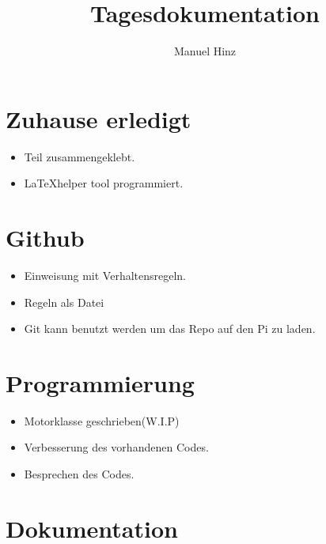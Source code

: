 \documentclass{article}
\author{Manuel Hinz}
\title{Tagesdokumentation}
\begin{document}
\maketitle

\section{Zuhause erledigt}

\begin{itemize}

\item Teil zusammengeklebt.

\item \LaTeX helper tool programmiert. 

\end{itemize}

\section{Github}

\begin{itemize}

\item Einweisung mit Verhaltensregeln.

\item Regeln als Datei

\item Git kann benutzt werden um das Repo auf den Pi zu laden.

\end{itemize}

\section{Programmierung}

\begin{itemize}

\item Motorklasse geschrieben(W.I.P)

\item Verbesserung des vorhandenen Codes.

\item Besprechen des Codes.

\end{itemize}

\section{Dokumentation}
\end{document}
